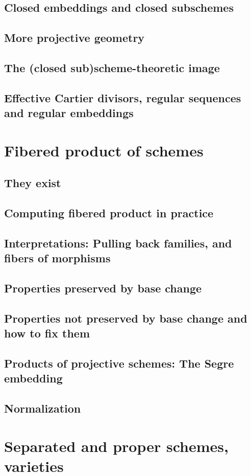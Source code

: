\documentclass[11pt]{book} %
\begin{document}
\section{Closed embeddings and closed subschemes}
\section{More projective geometry}
\section{The (closed sub)scheme-theoretic image}
\section{Effective Cartier divisors, regular sequences and regular embeddings}
\chapter{Fibered product of schemes}
\section{They exist}
\section{Computing fibered product in practice}
\section{Interpretations: Pulling back families, and fibers of morphisms}
\section{Properties preserved by base change}
\section{Properties not preserved by base change and how to fix them}
\section{Products of projective schemes: The Segre embedding}
\section{Normalization}
\chapter{Separated and proper schemes, varieties}
\end{document}
